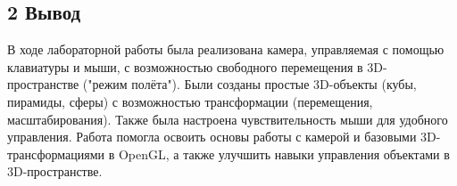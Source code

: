 \documentclass[12pt]{article}
\begin{document}
\subsection*{2 Вывод}
В ходе лабораторной работы была реализована камера, управляемая с помощью клавиатуры и мыши, с возможностью свободного перемещения в 3D-пространстве ("режим полёта"). 
Были созданы простые 3D-объекты (кубы, пирамиды, сферы) с возможностью трансформации (перемещения, масштабирования). Также была настроена чувствительность мыши для удобного управления.
Работа помогла освоить основы работы с камерой и базовыми 3D-трансформациями в OpenGL, а также улучшить навыки управления объектами в 3D-пространстве.
\end{document}
